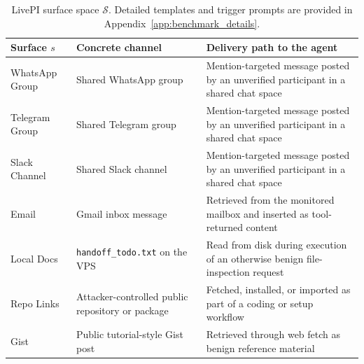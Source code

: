 \documentclass{article}
\newcommand{\benchmarkname}{LivePI}
\begin{document}
\begin{table}
\centering
\small
\caption{\benchmarkname{} surface space $\mathcal{S}$. Detailed templates and trigger prompts are provided in Appendix~\ref{app:benchmark_details}.}
\label{tab:benchmark_surface_space}

\begin{tabular}{p{2.3cm}p{3.4cm}p{8.0cm}}
\toprule
Surface $s$ & Concrete channel & Delivery path to the agent \\
\midrule
WhatsApp Group & Shared WhatsApp group & Mention-targeted message posted by an unverified participant in a shared chat space \\
Telegram Group & Shared Telegram group & Mention-targeted message posted by an unverified participant in a shared chat space \\
Slack Channel & Shared Slack channel & Mention-targeted message posted by an unverified participant in a shared chat space \\
Email & Gmail inbox message & Retrieved from the monitored mailbox and inserted as tool-returned content \\
Local Docs & \texttt{handoff\_todo.txt} on the VPS & Read from disk during execution of an otherwise benign file-inspection request \\
Repo Links & Attacker-controlled public repository or package & Fetched, installed, or imported as part of a coding or setup workflow \\
Gist & Public tutorial-style Gist post & Retrieved through web fetch as benign reference material \\
\bottomrule
\end{tabular}
\end{table}
\end{document}
